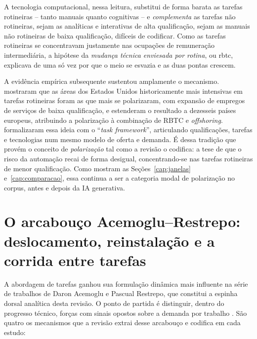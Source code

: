 A tecnologia computacional, nessa leitura, substitui de forma barata as tarefas rotineiras -- tanto manuais quanto cognitivas -- e \emph{complementa} as tarefas não rotineiras, sejam as analíticas e interativas de alta qualificação, sejam as manuais não rotineiras de baixa qualificação, difíceis de codificar. Como as tarefas rotineiras se concentravam justamente nas ocupações de remuneração intermediária, a hipótese da \emph{mudança técnica enviesada por rotina}, ou \gls{rbtc}, explicava de uma só vez por que o meio se esvazia e as duas pontas crescem.

A evidência empírica subsequente sustentou amplamente o mecanismo. \textcite{autorDorn2013} mostraram que as áreas dos Estados Unidos historicamente mais intensivas em tarefas rotineiras foram as que mais se polarizaram, com expansão de empregos de serviços de baixa qualificação, e \textcite{goosManningSalomons2014} estenderam o resultado a dezesseis países europeus, atribuindo a polarização à combinação de RBTC e \textit{offshoring}. \textcite{acemogluAutor2011} formalizaram essa ideia com o ``\textit{task framework}'', articulando qualificações, tarefas e tecnologias num mesmo modelo de oferta e demanda. É dessa tradição que provém o conceito de \emph{polarização} tal como a revisão o codifica: a tese de que o risco da automação recai de forma desigual, concentrando-se nas tarefas rotineiras de menor qualificação. Como mostram as Seções~\ref{cap:janelas} e~\ref{cap:comparacao}, essa continua a ser a categoria modal de polarização no corpus, antes e depois da IA generativa.

\section{O arcabouço Acemoglu--Restrepo: deslocamento, reinstalação e a corrida entre tarefas}

A abordagem de tarefas ganhou sua formulação dinâmica mais influente na série de trabalhos de Daron Acemoglu e Pascual Restrepo, que constitui a espinha dorsal analítica desta revisão. O ponto de partida é distinguir, dentro do progresso técnico, forças com sinais opostos sobre a demanda por trabalho \parencite{acemogluRestrepo2018, acemogluRestrepo2019}. São quatro os mecanismos que a revisão extrai desse arcabouço e codifica em cada estudo:

